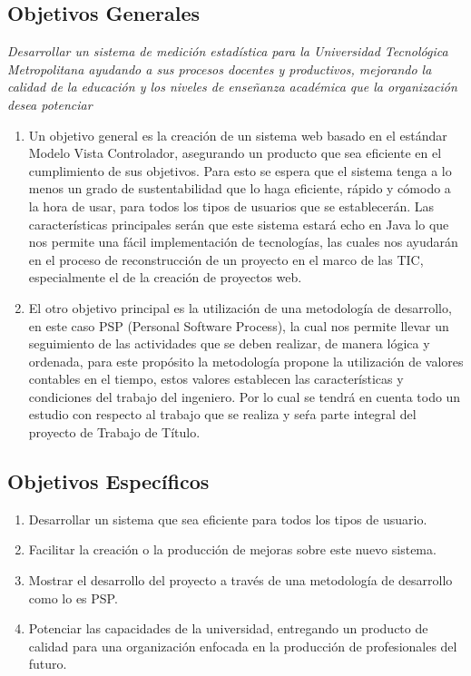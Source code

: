 \documentclass[a4paper,12pt,openany,oneside]{book}
\begin{document}
\subsection{Objetivos Generales}
\textit{Desarrollar un sistema de medición estadística para la Universidad Tecnológica Metropolitana ayudando a sus procesos docentes y productivos, mejorando la calidad de la educación y los niveles de enseñanza académica que la organización desea potenciar}
\begin{enumerate}
\item Un objetivo general es la creación de un sistema web basado en el estándar Modelo Vista Controlador, asegurando un producto que sea eficiente en el cumplimiento de sus objetivos. Para esto se espera que el sistema tenga a lo menos un grado de sustentabilidad que lo haga eficiente, rápido y cómodo a la hora de usar, para todos los tipos de usuarios que se establecerán. Las características principales serán que este sistema estará echo en Java lo que nos permite una fácil implementación de tecnologías, las cuales nos ayudarán en el proceso de reconstrucción de un proyecto en el marco de las TIC, especialmente el de la creación de proyectos web.
\item El otro objetivo principal es la utilización de una metodología de desarrollo, en este caso PSP (Personal Software Process), la cual nos permite llevar un seguimiento de las actividades que se deben realizar, de manera lógica y ordenada, para este propósito la metodología propone la utilización de valores contables en el tiempo, estos valores establecen las características y condiciones del trabajo del ingeniero. Por lo cual se tendrá en cuenta todo un estudio con respecto al trabajo que se realiza y seŕa parte integral del proyecto de Trabajo de Título.
\end{enumerate}
\subsection{Objetivos Específicos}
\begin{enumerate}
	\item Desarrollar un sistema que sea eficiente para todos los tipos de usuario.
	\item Facilitar la creación o la producción de mejoras sobre este nuevo sistema.
	\item Mostrar el desarrollo del proyecto a través de una metodología de desarrollo como lo es PSP.
	\item Potenciar las capacidades de la universidad, entregando un producto de calidad para una organización enfocada en la producción de profesionales del futuro.
\end{enumerate}
\end{document}
